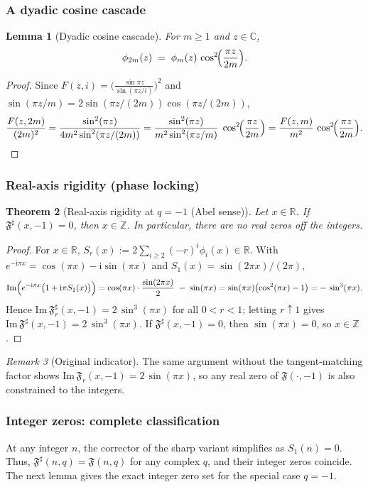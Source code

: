 \documentclass[11pt,a4paper]{amsart}
\newcommand{\C}{\mathbb{C}}
\newcommand{\R}{\mathbb{R}}
\newcommand{\Z}{\mathbb{Z}}
\newcommand{\ii}{\mathrm{i}}
\newcommand{\Fbase}{\mathfrak F}
\newcommand{\Fsharp}{\Fbase^{\sharp}}
\theoremstyle{plain}
\newtheorem{theorem}{Theorem}[section]
\newtheorem{lemma}[theorem]{Lemma}
\theoremstyle{definition}
\theoremstyle{remark}
\newtheorem{remark}[theorem]{Remark}
\begin{document}
\subsubsection*{A dyadic cosine cascade}
\begin{lemma}[Dyadic cosine cascade]
\label{lem:dyadic-cascade}
For $m\ge1$ and $z\in\C$,
\[
\phi_{2m}(z)\;=\;\phi_{m}(z)\,\cos^{2}\!\Bigl(\frac{\pi z}{2m}\Bigr).
\]
\end{lemma}

\begin{proof}
Since $F(z,i)=\bigl(\frac{\sin\pi z}{\sin(\pi z/i)}\bigr)^2$ and $\sin(\pi z/m)=2\sin(\pi z/(2m))\cos(\pi z/(2m))$,
\[
\frac{F(z,2m)}{(2m)^2}
=\frac{\sin^2(\pi z)}{4m^2\sin^2(\pi z/(2m))}
=\frac{\sin^2(\pi z)}{m^2\sin^2(\pi z/m)}\;\cos^2\!\Bigl(\frac{\pi z}{2m}\Bigr)
=\frac{F(z,m)}{m^2}\,\cos^2\!\Bigl(\frac{\pi z}{2m}\Bigr).
\]
\end{proof}

\subsubsection*{Real-axis rigidity (phase locking)}
\begin{theorem}[Real-axis rigidity at $q=-1$ (Abel sense)]
\label{thm:qminus1-no-offinteger}
Let $x\in\R$. If $\Fsharp(x,-1)=0$, then $x\in\Z$. In particular, there are no real zeros off the integers.
\end{theorem}

\begin{proof}
For $x\in\R$, $S_r(x):=2\sum_{i\ge2}(-r)^i\phi_i(x)\in\R$.
With $e^{-\ii\pi x}=\cos(\pi x)-\ii\sin(\pi x)$ and $S_1(x)=\sin(2\pi x)/(2\pi)$,
\[
\mathrm{Im}\Bigl(e^{-\ii\pi x}\bigl(1+\ii\pi S_1(x)\bigr)\Bigr)
=\cos(\pi x)\cdot \frac{\sin(2\pi x)}{2}\;-\;\sin(\pi x)
=\sin(\pi x)\bigl(\cos^2(\pi x)-1\bigr)
=-\,\sin^{3}(\pi x).
\]
Hence $\mathrm{Im}\,\Fsharp_r(x,-1)=2\,\sin^{3}(\pi x)$ for all $0<r<1$; letting $r\uparrow1$ gives
$\mathrm{Im}\,\Fsharp(x,-1)=2\,\sin^{3}(\pi x)$. If $\Fsharp(x,-1)=0$, then $\sin(\pi x)=0$, so $x\in\Z$.
\end{proof}

\begin{remark}[Original indicator]
The same argument without the tangent-matching factor shows
$\mathrm{Im}\,\mathfrak F_r(x,-1)=2\,\sin(\pi x)$, so any real zero of $\mathfrak F(\cdot,-1)$ is also constrained to the integers.
\end{remark}

\subsubsection*{Integer zeros: complete classification}
At any integer $n$, the corrector of the sharp variant simplifies as $S_1(n)=0$. Thus, $\Fsharp(n,q)=\mathfrak F(n,q)$ for any complex $q$, and their integer zeros coincide. The next lemma gives the exact integer zero set for the special case $q=-1$.
\end{document}
